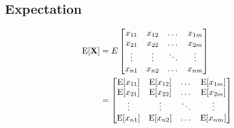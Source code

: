 \documentclass[../main.tex]{subfiles}
\begin{document}
\subsection{Expectation}
\begin{align*}
    \mathrm{E}[\mathbf{X}] &= E
    \begin{bmatrix}
        x_{11} & x_{12} & \dots & x_{1m} \\
        x_{21} & x_{22} & \dots & x_{2m} \\
        \vdots & \vdots & \ddots & \vdots \\
        x_{n1} & x_{n2} & \dots & x_{nm} \\
    \end{bmatrix}\\
    &= \begin{bmatrix}
        \mathrm{E}[x_{11}] & \mathrm{E}[x_{12}] & \dots & \mathrm{E}[x_{1m}] \\
        \mathrm{E}[x_{21}] & \mathrm{E}[x_{22}] & \dots & \mathrm{E}[x_{2m}] \\
        \vdots & \vdots & \ddots & \vdots \\
        \mathrm{E}[x_{n1}] & \mathrm{E}[x_{n2}] & \dots & \mathrm{E}[x_{nm}] \\
    \end{bmatrix}
\end{align*}
\end{document}
